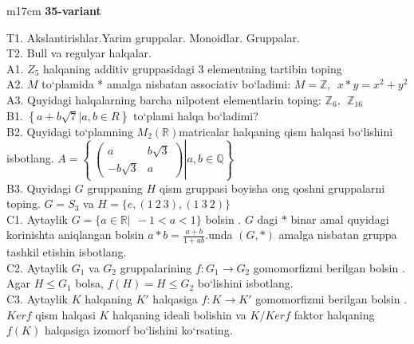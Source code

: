 \documentclass{article}
\begin{document}
\begin{tabular}{m{17cm}}
\textbf{35-variant}
\newline

T1. Akslantirishlar.Yarim gruppalar. Monoidlar. Gruppalar. \\
T2. Bull va regulyar halqalar. \\
A1. \(Z_{5}\) halqaning additiv gruppasidagi 3 elementning tartibin toping \\
A2. \(M\) to`plamida * amalga nisbatan associativ bo`ladimi: \(M\mathbb{= Z},\ \ x*y = x^{2} + y^{2}\) \\
A3. Quyidagi halqalarning barcha nilpotent elementlarin toping: \(\mathbb{Z}_{6},\ \ \mathbb{Z}_{16}\) \\
B1. \(\left\{ a + b\sqrt{7}|a,b \in R \right\}\) to`plami halqa bo`ladimi? \\
B2. Quyidagi to`plamning \(M_{2}(\mathbb{R})\)matricalar halqaning qism halqasi bo`lishini isbotlang. \(A = \left\{ \left. \ \begin{pmatrix}
a & b\sqrt{3} \\
 - b\sqrt{3} & a
\end{pmatrix} \right|a,b\mathbb{\in Q} \right\}\) \\
B3. Quyidagi \(G\) gruppaning \(H\) qism gruppasi boyisha o\textquotesingle ng qo\textquotesingle shni gruppalarni toping. \(G = S_{3}\) va \(H = \{ e,(1\ 2\ 3),(1\ 3\ 2)\}\) \\
C1. Aytaylik \(G = \{ a\mathbb{\in R}|\ \  - 1 < a < 1\}\) bo\textquotesingle lsin . \(G\) dagi \(*\) binar amal quyidagi ko\textquotesingle rinishta aniqlangan bo\textquotesingle lsin \(a*b = \frac{a + b}{1 + ab}.\)unda \((G,*)\) amalga nisbatan gruppa tashkil etishin isbotlang. \\
C2. Aytaylik \(G_{1}\) va \(G_{2}\) gruppalarining \(f:G_{1} \rightarrow G_{2}\) gomomorfizmi berilgan bo\textquotesingle lsin . Agar \(H \leq G_{1}\) bolsa, \(f(H) = H \leq G_{2}\) bo`lishini isbotlang. \\
C3. Aytaylik \(K\) halqaning \(K'\) halqasiga \(f:K \rightarrow K'\) gomomorfizmi berilgan bo\textquotesingle lsin . \(Kerf\) qism halqasi \(K\) halqaning ideali bo\textquotesingle lishin va \(K/Kerf\) faktor halqaning \(f(K)\) halqasiga izomorf bo`lishini ko`rsating. \\

\end{tabular}
\vspace{1cm}
\end{document}
